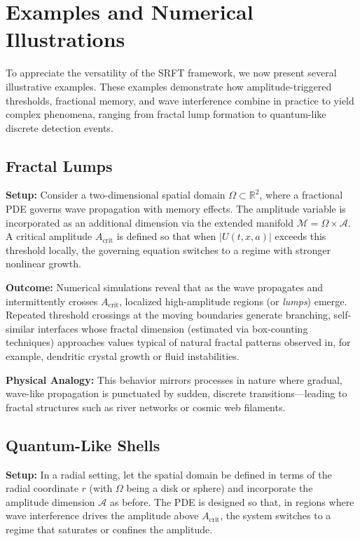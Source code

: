 \documentclass[12pt]{article}
\begin{document}
\section{Examples and Numerical Illustrations}
\label{sec:examples}

To appreciate the versatility of the SRFT framework, we now present several illustrative examples. These examples demonstrate how amplitude-triggered thresholds, fractional memory, and wave interference combine in practice to yield complex phenomena, ranging from fractal lump formation to quantum-like discrete detection events.

\medskip

\subsection{Fractal Lumps}
\label{subsec:fractal_lumps}

\textbf{Setup:}  
Consider a two-dimensional spatial domain $\Omega \subset \mathbb{R}^2$, where a fractional PDE governs wave propagation with memory effects. The amplitude variable is incorporated as an additional dimension via the extended manifold $\mathcal{M} = \Omega \times \mathcal{A}$. A critical amplitude $A_{\mathrm{crit}}$ is defined so that when $|U(t,x,a)|$ exceeds this threshold locally, the governing equation switches to a regime with stronger nonlinear growth.

\textbf{Outcome:}  
Numerical simulations reveal that as the wave propagates and intermittently crosses $A_{\mathrm{crit}}$, localized high-amplitude regions (or \emph{lumps}) emerge. Repeated threshold crossings at the moving boundaries generate branching, self-similar interfaces whose fractal dimension (estimated via box-counting techniques) approaches values typical of natural fractal patterns observed in, for example, dendritic crystal growth or fluid instabilities.

\textbf{Physical Analogy:}  
This behavior mirrors processes in nature where gradual, wave-like propagation is punctuated by sudden, discrete transitions—leading to fractal structures such as river networks or cosmic web filaments.

\medskip

\subsection{Quantum-Like Shells}
\label{subsec:quantum_shells}

\textbf{Setup:}  
In a radial setting, let the spatial domain be defined in terms of the radial coordinate $r$ (with $\Omega$ being a disk or sphere) and incorporate the amplitude dimension $\mathcal{A}$ as before. The PDE is designed so that, in regions where wave interference drives the amplitude above $A_{\mathrm{crit}}$, the system switches to a regime that saturates or confines the amplitude.
\end{document}
